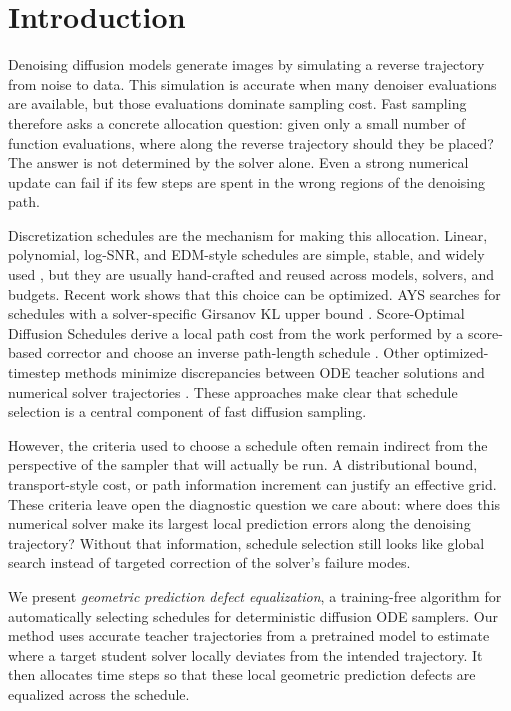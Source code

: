 \section{Introduction}
\label{sec:introduction}

Denoising diffusion models generate images by simulating a reverse trajectory
from noise to data. This simulation is accurate when many denoiser evaluations
are available, but those evaluations dominate sampling cost. Fast sampling
therefore asks a concrete allocation question: given only a small number of
function evaluations, where along the reverse trajectory should they be placed?
The answer is not determined by the solver alone. Even a strong numerical
update can fail if its few steps are spent in the wrong regions of the
denoising path.

Discretization schedules are the mechanism for making this allocation. Linear,
polynomial, log-SNR, and EDM-style schedules are simple, stable, and widely
used \citep{karras2022edm}, but they are usually hand-crafted and reused across
models, solvers, and budgets. Recent work shows that this choice can be
optimized. AYS searches for schedules with a solver-specific Girsanov KL upper
bound \citep{sabour2024ays}. Score-Optimal Diffusion Schedules derive a local
path cost from the work performed by a score-based corrector and choose an
inverse path-length schedule \citep{williams2024scoreoptimal}. Other
optimized-timestep methods minimize discrepancies between ODE teacher
solutions and numerical solver trajectories \citep{xue2024optimizedtimesteps}.
These approaches make clear that schedule selection is a central component of
fast diffusion sampling.

However, the criteria used to choose a schedule often remain indirect from the
perspective of the sampler that will actually be run. A distributional bound,
transport-style cost, or path information increment can justify an effective
grid. These criteria leave open the diagnostic question we care about: where
does this numerical solver make its largest local prediction errors along the
denoising trajectory? Without that information, schedule selection still looks
like global search instead of targeted correction of the solver's failure modes.

We present \emph{geometric prediction defect equalization}, a training-free
algorithm for automatically selecting schedules for deterministic diffusion ODE
samplers. Our method uses accurate teacher trajectories from a pretrained model
to estimate where a target student solver locally deviates
from the intended trajectory. It then allocates time steps so that these local
geometric prediction defects are equalized across the schedule.


